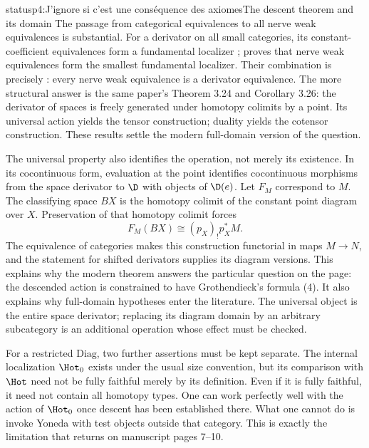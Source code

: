 \begin{dcomment}{status}{p4:J'ignore si c'est une conséquence des axiomes}{The descent theorem and its domain}
The passage from categorical equivalences to all nerve weak equivalences is substantial. For a derivator on all small categories, its constant-coefficient equivalences form a fundamental localizer \citep[Proposition 3.7]{Cisinski2008}; \citet[Theorem 2.2.11]{Cisinski2004Minimal} proves that nerve weak equivalences form the smallest fundamental localizer. Their combination is precisely \citet[Corollary 3.10]{Cisinski2008}: every nerve weak equivalence is a derivator equivalence. The more structural answer is the same paper's Theorem 3.24 and Corollary 3.26: the derivator of spaces is freely generated under homotopy colimits by a point. Its universal action yields the tensor construction; duality yields the cotensor construction. These results settle the modern full-domain version of the question.

The universal property also identifies the operation, not merely its existence. In its cocontinuous form, evaluation at the point identifies cocontinuous morphisms from the space derivator to \(\D\) with objects of \(\D(e)\). Let \(F_M\) correspond to \(M\). The classifying space \(B X\) is the homotopy colimit of the constant point diagram over \(X\). Preservation of that homotopy colimit forces
\[
 F_M(B X)\cong (p_X)_!p_X^*M.
\]
The equivalence of categories makes this construction functorial in maps \(M\to N\), and the statement for shifted derivators supplies its diagram versions. This explains why the modern theorem answers the particular question on the page: the descended action is constrained to have Grothendieck's formula (4). It also explains why full-domain hypotheses enter the literature. The universal object is the entire space derivator; replacing its diagram domain by an arbitrary subcategory is an additional operation whose effect must be checked.

For a restricted \(\mathrm{Diag}\), two further assertions must be kept separate. The internal localization \(\Hot_0\) exists under the usual size convention, but its comparison with \(\Hot\) need not be fully faithful merely by its definition. Even if it is fully faithful, it need not contain all homotopy types. One can work perfectly well with the action of \(\Hot_0\) once descent has been established there. What one cannot do is invoke Yoneda with test objects outside that category. This is exactly the limitation that returns on manuscript pages 7--10.
\end{dcomment}

